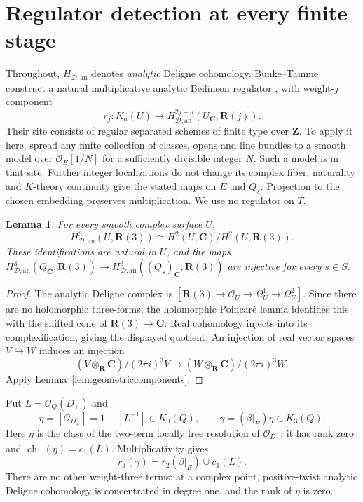 \documentclass[11pt,a4paper]{article}
\newtheorem{lemma}[theorem]{Lemma}
\theoremstyle{remark}
\newcommand{\Z}{\mathbf Z}
\newcommand{\R}{\mathbf R}
\newcommand{\C}{\mathbf C}
\newcommand{\OO}{\mathcal O}
\newcommand{\HD}{H_{\mathcal D,\mathrm{an}}}
\begin{document}
\section{Regulator detection at every finite stage}
\label{sec:geometricregulator}

Throughout, \(\HD\) denotes \emph{analytic} Deligne cohomology.
Bunke--Tamme construct a natural multiplicative analytic Beilinson
regulator \cite[Remark~2.6 and Theorem~2.31]{BunkeTamme},
with weight-\(j\) component
\[
 r_j:K_a(U)\longrightarrow\HD^{2j-a}(U_{\C},\R(j)).
\]
Their site consists of regular separated schemes of finite type
over \(\Z\). To apply it here, spread any finite collection of
classes, opens and line bundles to a smooth model over
\(\OO_E[1/N]\) for a sufficiently divisible integer \(N\).
Such a model is in that site. Further integer localizations do not
change its complex fiber; naturality and \(K\)-theory continuity
give the stated maps on \(E\) and \(Q_s\). Projection to the chosen
embedding preserves multiplication. We use no regulator on \(T\).

\begin{lemma}\label{lem:geometricdeligne}
For every smooth complex surface \(U\),
\[
 \HD^3(U,\R(3))\cong H^2(U,\C)/H^2(U,\R(3)).
\]
These identifications are natural in \(U\), and the maps
\(\HD^3(Q_{\C},\R(3))\to\HD^3((Q_s)_{\C},\R(3))\)
are injective for every \(s\in S\).
\end{lemma}
\begin{proof}
The analytic Deligne complex is
\([\R(3)\to\OO_U\to\Omega_U^1\to\Omega_U^2]\).
Since there are no holomorphic three-forms, the holomorphic
Poincar\'e lemma identifies this with the shifted cone of
\(\R(3)\to\C\).
Real cohomology injects into its complexification, giving the
displayed quotient. An injection of real vector spaces
\(V\hookrightarrow W\) induces an injection
\[
 (V\otimes_{\R}\C)/(2\pi i)^3V
 \longrightarrow (W\otimes_{\R}\C)/(2\pi i)^3W.
\]
Apply Lemma~\ref{lem:geometriccomponents}.
\end{proof}

Put \(L=\OO_Q(D_+)\) and
\[
 \eta=[\OO_{D_+}]=1-[L^{-1}]\in K_0(Q),\qquad
 \gamma=(\beta|_E)\eta\in K_3(Q).
\]
Here \(\eta\) is the class of the two-term locally free resolution
of \(\OO_{D_+}\); it has rank zero and
\(\operatorname{ch}_1(\eta)=c_1(L)\).
Multiplicativity gives
\begin{equation}\label{eq:geometricproduct}
 r_3(\gamma)=r_2(\beta|_E)\cup c_1(L).
\end{equation}
There are no other weight-three terms: at a complex point,
positive-twist analytic Deligne cohomology is concentrated in
degree one, and the rank of \(\eta\) is zero.
\end{document}
